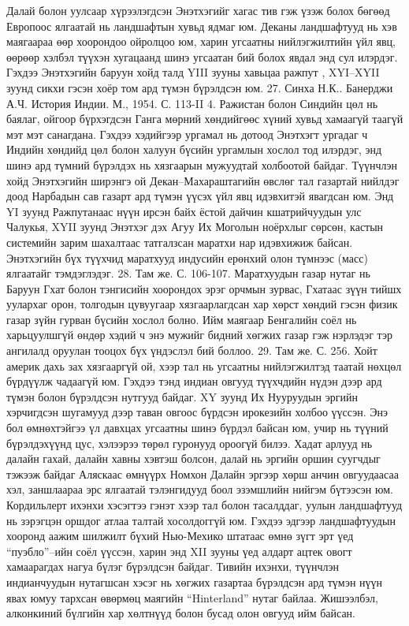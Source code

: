 Далай болон уулсаар хүрээлэгдсэн Энэтхэгийг хагас тив гэж үзэж болох бөгөөд Европоос ялгаатай нь ландшафтын хувьд ядмаг юм. Деканы ландшафтууд нь хэв маягаараа өөр хоорондоо ойролцоо юм, харин угсаатны нийлэгжилтийн үйл явц, өөрөөр хэлбэл түүхэн хугацаанд шинэ угсаатан бий болох явдал энд сул илэрдэг. Гэхдээ Энэтхэгийн баруун хойд талд YIII зууны хавьцаа ражпут , XYI–XYII зуунд сикхи гэсэн хоёр том ард түмэн бүрэлдсэн юм. 27. Синха Н.К.. Банерджи А.Ч. История Индии. М., 1954. С. 113-II 4.
Ражистан болон Синдийн цөл нь баялаг, ойгоор бүрхэгдсэн Ганга мөрний хөндийгөөс хүний хувьд хамаагүй таагүй мэт мэт санагдана. Гэхдээ хэдийгээр ургамал нь дотоод Энэтхэгт ургадаг ч Индийн хөндийд цөл болон халуун бүсийн ургамлын хослол тод илэрдэг, энд шинэ ард түмний бүрэлдэх нь хязгаарын мужуудтай холбоотой байдаг.
Түүнчлэн хойд Энэтхэгийн ширэнгэ ой Декан–Махараштагийн өвслөг тал газартай нийлдэг доод Нарбадын сав газарт ард түмэн үүсэх үйл явц идэвхитэй явагдсан юм. Энд YI зуунд Ражпутанаас нүүн ирсэн байх ёстой дайчин кшатрийчуудын улс Чалукья, XYII зуунд Энэтхэг дэх Агуу Их Моголын ноёрхлыг сөрсөн, кастын системийн зарим шахалтаас татгалзсан маратхи нар идэвхижиж байсан. Энэтхэгийн бүх түүхчид маратхууд индусийн ерөнхий олон түмнээс (масс) ялгаатайг тэмдэглэдэг. 28. Там же. С. 106-107.
Маратхуудын газар нутаг нь Баруун Гхат болон тэнгисийн хоорондох эрэг орчмын зурвас, Гхатаас зүүн тийшх уулархаг орон, толгодын цувуугаар хязгаарлагдсан хар хөрст хөндий гэсэн физик газар зүйн гурван бүсийн хослол болно. Ийм маягаар Бенгалийн соёл нь харьцуулшгүй өндөр хэдий ч энэ мужийг бидний хөгжих газар гэж нэрлэдэг тэр ангилалд оруулан тооцох бүх үндэслэл бий боллоо. 29. Там же. С. 256.
Хойт америк дахь зах хязгааргүй ой, хээр тал нь угсаатны нийлэгжилтэд таатай нөхцөл бүрдүүлж чадаагүй юм. Гэхдээ тэнд индиан овгууд түүхчдийн нүдэн дээр ард түмэн болон бүрэлдсэн нутгууд байдаг. XY зуунд Их Нууруудын эргийн хэрчигдсэн шугамууд дээр таван овгоос бүрдсэн ирокезийн холбоо үүссэн. Энэ бол өмнөхтэйгээ үл давхцах угсаатны шинэ бүрдэл байсан юм, учир нь түүний бүрэлдэхүүнд цус, хэлээрээ төрөл гуронууд ороогүй билээ.
Хадат арлууд нь далайн гахай, далайн хавны хэвтэш болсон, далай нь эргийн оршин суугчдыг тэжээж байдаг Аляскаас өмнүүрх Номхон Далайн эргээр хөрш анчин овгуудаасаа хэл, заншлаараа эрс ялгаатай тэлэнгидууд боол эзэмшлийн нийгэм бүтээсэн юм.
Кордильлерт ихэнхи хэсэгтээ гэнэт хээр тал болон тасалддаг, уулын ландшафтууд нь зэрэгцэн оршдог атлаа талтай хосолдоггүй юм. Гэхдээ эдгээр ландшафтуудын хооронд аажим шилжилт бүхий Нью-Мехико штатаас өмнө зүгт эрт үед “пуэбло”–ийн соёл үүссэн, харин энд XII зууны үед алдарт ацтек овогт хамаарагдах нагуа бүлэг бүрэлдсэн байдаг. Тивийн ихэнхи, түүнчлэн индианчуудын нутагшсан хэсэг нь хөгжих газартаа бүрэлдсэн ард түмэн нүүн явах юмуу тархсан өвөрмөц маягийн “Hinterland” нутаг байлаа. Жишээлбэл, алконкиний бүлгийн хар хөлтнүүд болон бусад олон овгууд ийм байсан.
